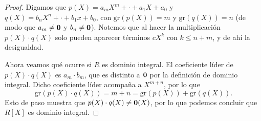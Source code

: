 \begin{proof}
Digamos que $p(X) = a_mX^m + \cdot + a_1X + a_0$ y $q(X) = b_nX^n + \cdot + b_1x+b_0$, con $\mathrm{gr}(p(X)) = m$ y $\mathrm{gr}(q(X)) = n$ (de modo que $a_m \neq \mathbf{0}$ y $b_n \neq \mathbf{0}$). Notemos que al hacer la multiplicación $p(X) \cdot q(X)$ solo pueden aparecer términos $c X^k$ con $k \leq n + m$, y de ahí la desigualdad.

Ahora veamos qué ocurre si $R$ es dominio integral. El coeficiente líder de $p(X) \cdot q(X)$ es $a_m \cdot b_m$, que es distinto a $\mathbf{0}$ por la definición de dominio integral. Dicho coeficiente líder acompaña a $X^{m+n}$, por lo que 
$$\mathrm{gr}(p(X) \cdot q(X)) = m + n = \mathrm{gr}(p(X)) + \mathrm{gr}(q(X)).$$
Esto de paso muestra que $p(X) \cdot q(X) \neq \mathbf{0}(X)$, por lo que podemos concluir que $R[X]$ es dominio integral.
\end{proof}